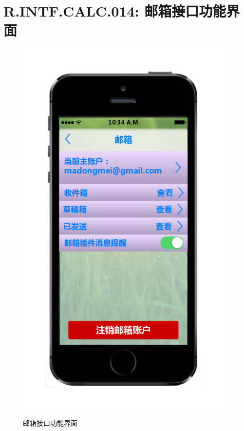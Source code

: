     \section{R.INTF.CALC.014: 邮箱接口功能界面}
    \begin{figure}[h]
        \centering
        \includegraphics[scale=0.6]{OutlineDesign/figures/邮箱接口功能界面.png}
        \caption{邮箱接口功能界面}
        \label{fig:server_flow}
    \end{figure}
    \newpage
    